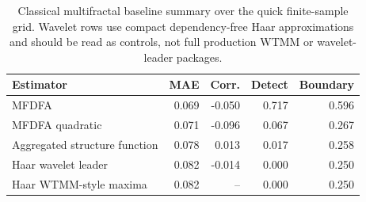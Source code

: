 \begin{table}[t]
\centering
\small
\caption{Classical multifractal baseline summary over the quick finite-sample grid. Wavelet rows use compact dependency-free Haar approximations and should be read as controls, not full production WTMM or wavelet-leader packages.}
\label{tab:classical_multifractal_baselines}
\begin{tabular}{lrrrr}
\toprule
Estimator & MAE & Corr. & Detect & Boundary \\
\midrule
MFDFA & 0.069 & -0.050 & 0.717 & 0.596 \\
MFDFA quadratic & 0.071 & -0.096 & 0.067 & 0.267 \\
Aggregated structure function & 0.078 & 0.013 & 0.017 & 0.258 \\
Haar wavelet leader & 0.082 & -0.014 & 0.000 & 0.250 \\
Haar WTMM-style maxima & 0.082 & -- & 0.000 & 0.250 \\
\bottomrule
\end{tabular}
\end{table}
